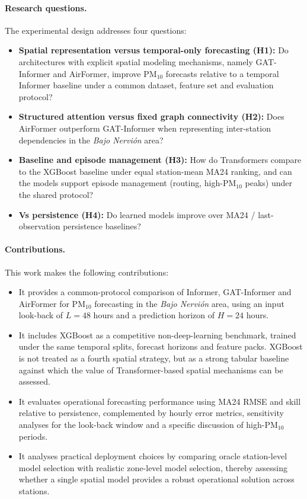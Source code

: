 \documentclass[11pt]{article}
\newenvironment{revnewblock}{%
  \begingroup\color{orange!75!black}%
}{%
  \endgroup%
}
\begin{document}
\begin{revnewblock}
\paragraph{Research questions.}
The experimental design addresses four questions:
\begin{itemize}[leftmargin=1.4em,itemsep=0.25em]
\item \textbf{Spatial representation versus temporal-only forecasting (H1):} Do architectures with explicit spatial modeling mechanisms, namely GAT-Informer and AirFormer, improve PM$_{10}$ forecasts relative to a temporal Informer baseline under a common dataset, feature set and evaluation protocol?
\item \textbf{Structured attention versus fixed graph connectivity (H2):} Does AirFormer outperform GAT-Informer when representing inter-station dependencies in the \textit{Bajo Nervi\'on} area?
\item \textbf{Baseline and episode management (H3):} How do Transformers compare to the XGBoost baseline under equal station-mean MA24 ranking, and can the models support episode management (routing, high-PM$_{10}$ peaks) under the shared protocol?
\item \textbf{Vs persistence (H4):} Do learned models improve over MA24 / last-observation persistence baselines?
\end{itemize}

\paragraph{Contributions.}
This work makes the following contributions:
\begin{itemize}[leftmargin=1.4em,itemsep=0.25em]
\item It provides a common-protocol comparison of Informer, GAT-Informer and AirFormer for PM$_{10}$ forecasting in the \textit{Bajo Nervi\'on} area, using an input look-back of $L=48$ hours and a prediction horizon of $H=24$ hours.
\item It includes XGBoost as a competitive non-deep-learning benchmark, trained under the same temporal splits, forecast horizons and feature packs. XGBoost is not treated as a fourth spatial strategy, but as a strong tabular baseline against which the value of Transformer-based spatial mechanisms can be assessed.
\item It evaluates operational forecasting performance using MA24 RMSE and skill relative to persistence, complemented by hourly error metrics, sensitivity analyses for the look-back window and a specific discussion of high-PM$_{10}$ periods.
\item It analyses practical deployment choices by comparing oracle station-level model selection with realistic zone-level model selection, thereby assessing whether a single spatial model provides a robust operational solution across stations.
\end{itemize}
\end{revnewblock}
\end{document}
